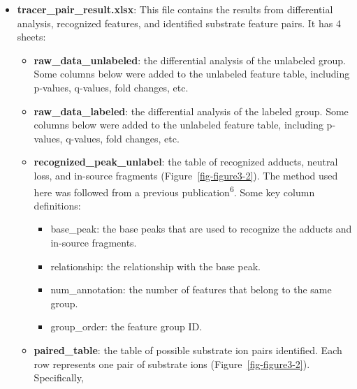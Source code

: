 \documentclass[
  letterpaper,
  DIV=11,
  numbers=noendperiod]{scrreprt}
\providecommand{\tightlist}{%
  \setlength{\itemsep}{0pt}\setlength{\parskip}{0pt}}
\begin{document}
\begin{itemize}
\item
  \textbf{tracer\_pair\_result.xlsx}: This file contains the results
  from differential analysis, recognized features, and identified
  substrate feature pairs. It has 4 sheets:

  \begin{itemize}
  \tightlist
  \item
    \textbf{raw\_data\_unlabeled}: the differential analysis of the
    unlabeled group. Some columns below were added to the unlabeled
    feature table, including p-values, q-values, fold changes, etc.
  \item
    \textbf{raw\_data\_labeled}: the differential analysis of the
    labeled group. Some columns below were added to the unlabeled
    feature table, including p-values, q-values, fold changes, etc.
  \item
    \textbf{recognized\_peak\_unlabel}: the table of recognized adducts,
    neutral loss, and in-source fragments (Figure~\ref{fig-figure3-2}).
    The method used here was followed from a previous
    publication\textsuperscript{6}. Some key column definitions:

    \begin{itemize}
    \tightlist
    \item
      base\_peak: the base peaks that are used to recognize the adducts
      and in-source fragments.
    \item
      relationship: the relationship with the base peak.
    \item
      num\_annotation: the number of features that belong to the same
      group.
    \item
      group\_order: the feature group ID.
    \end{itemize}
  \item
    \textbf{paired\_table}: the table of possible substrate ion pairs
    identified. Each row represents one pair of substrate ions
    (Figure~\ref{fig-figure3-2}). Specifically,


\end{itemize}
\end{itemize}
\end{document}
